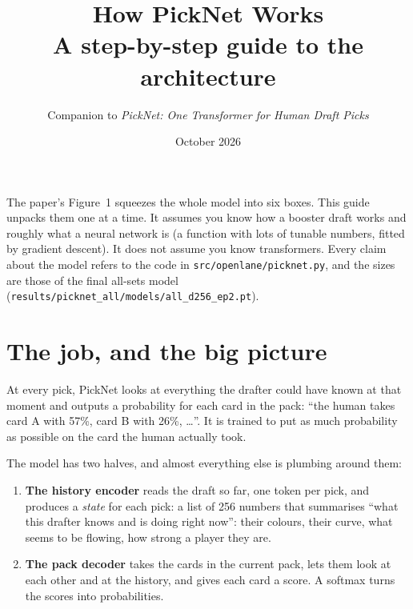 \documentclass[11pt,letterpaper]{article}
\title{\Large\bfseries How PickNet Works\\[2pt]\large A step-by-step guide to the architecture}
\author{Companion to \emph{PickNet: One Transformer for Human Draft Picks}}
\date{\small October 2026}
\newcommand{\code}[1]{\texttt{\small #1}}
\begin{document}
\maketitle

\noindent The paper's Figure~1 squeezes the whole model into six boxes. This guide unpacks them one at a
time. It assumes you know how a booster draft works and roughly what a neural network is (a function with
lots of tunable numbers, fitted by gradient descent). It does not assume you know transformers. Every
claim about the model refers to the code in \code{src/openlane/picknet.py}, and the sizes are those of the
final all-sets model (\code{results/picknet\_all/models/all\_d256\_ep2.pt}).

{\small\setlength{\parskip}{0pt}\tableofcontents}

\section{The job, and the big picture}

At every pick, PickNet looks at everything the drafter could have known at that moment and outputs a
probability for each card in the pack: ``the human takes card A with 57\%, card B with 26\%, \ldots''. It is
trained to put as much probability as possible on the card the human actually took.

The model has two halves, and almost everything else is plumbing around them:

\begin{enumerate}
\item \textbf{The history encoder} reads the draft so far, one token per pick, and produces a
\emph{state} for each pick: a list of 256 numbers that summarises ``what this drafter knows and is doing
right now'': their colours, their curve, what seems to be flowing, how strong a player they are.
\item \textbf{The pack decoder} takes the cards in the current pack, lets them look at each other and at
the history, and gives each card a score. A softmax turns the scores into probabilities.
\end{enumerate}
\end{document}
